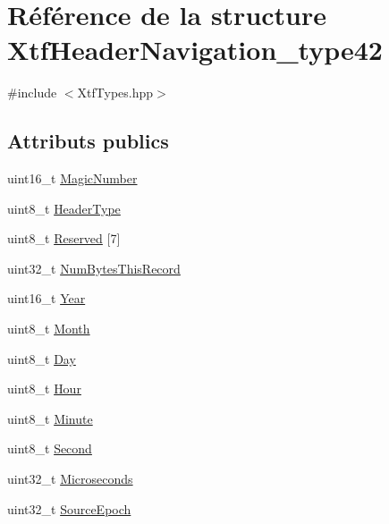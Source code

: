\hypertarget{structXtfHeaderNavigation__type42}{}\section{Référence de la structure Xtf\+Header\+Navigation\+\_\+type42}
\label{structXtfHeaderNavigation__type42}


{\ttfamily \#include $<$Xtf\+Types.\+hpp$>$}

\subsection*{Attributs publics}
\begin{DoxyCompactItemize}
\item 
uint16\+\_\+t \hyperlink{structXtfHeaderNavigation__type42_abd77970d2f172855cca6431c58d73cdf}{Magic\+Number}
\item 
uint8\+\_\+t \hyperlink{structXtfHeaderNavigation__type42_ae1d4cf5c81e5531928d5a21995ff2ef9}{Header\+Type}
\item 
uint8\+\_\+t \hyperlink{structXtfHeaderNavigation__type42_aa4b5d2746d6a3ca2b31befc7b3093d15}{Reserved} \mbox{[}7\mbox{]}
\item 
uint32\+\_\+t \hyperlink{structXtfHeaderNavigation__type42_a67c9b86f18b1b4d7b59e44949e86c1f0}{Num\+Bytes\+This\+Record}
\item 
uint16\+\_\+t \hyperlink{structXtfHeaderNavigation__type42_adc35d4b1ece422574a91829b3330a266}{Year}
\item 
uint8\+\_\+t \hyperlink{structXtfHeaderNavigation__type42_a385fba14ef74fe1f0487fa2bdb59ec9a}{Month}
\item 
uint8\+\_\+t \hyperlink{structXtfHeaderNavigation__type42_a7c70b71cc00baad0a1bc00ecb129c024}{Day}
\item 
uint8\+\_\+t \hyperlink{structXtfHeaderNavigation__type42_a6525083696ba2e06651009fbf05763e9}{Hour}
\item 
uint8\+\_\+t \hyperlink{structXtfHeaderNavigation__type42_a9277d358b25eefd262a8458de5a0b03d}{Minute}
\item 
uint8\+\_\+t \hyperlink{structXtfHeaderNavigation__type42_a82406f8d6f9c3ca70a7930a21a4c13a9}{Second}
\item 
uint32\+\_\+t \hyperlink{structXtfHeaderNavigation__type42_abaff8116ae9d1ae8219051b8b401daeb}{Microseconds}
\item 
uint32\+\_\+t \hyperlink{structXtfHeaderNavigation__type42_a546065eb5e81337ae20c3e5c8ca7d464}{Source\+Epoch}

\end{DoxyCompactItemize}

